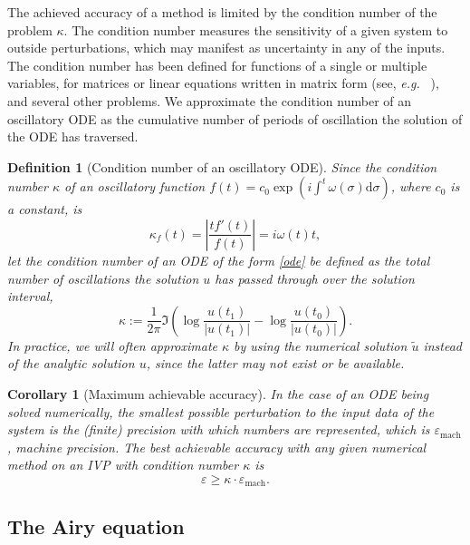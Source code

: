 \documentclass[10pt]{article}
\newcommand{\be}{\begin{equation}}
\newcommand{\ee}{\end{equation}}
\newcommand{\eg}{{\it e.g.\ }}
\newtheorem{cor}[thm]{Corollary}
\newtheorem{defn}[thm]{Definition}
\newcommand{\om}{\omega}
\begin{document}
The achieved accuracy of a method is limited by the condition number of the
problem $\kappa$. The condition number measures the sensitivity of a given system to
outside perturbations, which may manifest as uncertainty in any of the inputs.
The condition number has been defined for functions of a single or multiple
variables, for matrices or linear equations written in matrix form (see, \eg
\cite{rice1966,trefethenlinalg}), and several other problems. We approximate
the condition number of an oscillatory ODE as the cumulative number of periods of
oscillation the solution of the ODE has traversed.
\begin{defn}[Condition number of an oscillatory ODE]\label{conditionnodef}
    Since the condition number $\kappa$ of an oscillatory function $f(t) =
    c_0\exp(i\int^t \om(\sigma)\mathrm{d}\sigma)$, where $c_0$ is a constant,
    is
    \begin{equation}\label{conditionno}
        \kappa_f(t) = \left| \frac{tf'(t)}{f(t)} \right| = i\om(t)t,
    \end{equation}
    let the condition number of an ODE of the form \cref{ode} be defined as the total number of oscillations the solution $u$ has passed through over the solution interval, 
    \begin{equation}
        \kappa := \frac{1}{2\pi}\Im\left(\log\frac{u(t_1)}{|u(t_1)|}  - \log\frac{u(t_0)}{|u(t_0)|}\right).
    \end{equation}
    In practice, we will often approximate $\kappa$ by using the numerical
    solution $\tilde{u}$ instead of the analytic solution $u$, since the latter may not
    exist or be available.
\end{defn}

\begin{cor}[Maximum achievable accuracy]\label{mineps}
In the case of an ODE being solved numerically, the smallest possible
perturbation to the input data of the system is the (finite) precision with
which numbers are represented, which is $\varepsilon_{\mathrm{mach}}$, machine
precision. The best achievable accuracy with any given numerical method on an
IVP with condition number $\kappa$ is 
\be
\varepsilon \geq \kappa \cdot \varepsilon_{\mathrm{mach}}.
\ee
\end{cor}

\subsection{The Airy equation}
\end{document}
